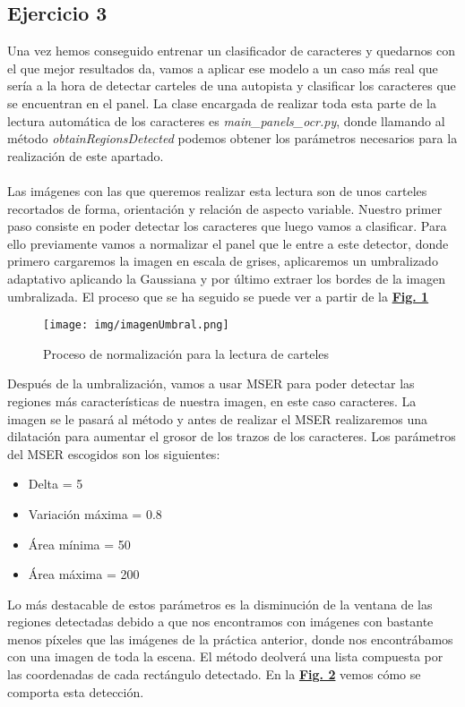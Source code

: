 \documentclass[a4paper, 12pt]{article}
\begin{document}
\subsection{Ejercicio 3}
Una vez hemos conseguido entrenar un clasificador de caracteres y quedarnos con el que mejor resultados da, vamos a aplicar ese modelo a un caso más real que sería a la hora de detectar carteles de una autopista y clasificar los caracteres que se encuentran en el panel. La clase encargada de realizar toda esta parte de la lectura automática de los caracteres es \textit{main\_panels\_ocr.py}, donde llamando al método \textit{obtainRegionsDetected} podemos obtener los parámetros necesarios para la realización de este apartado. \\\\
Las imágenes con las que queremos realizar esta lectura son de unos carteles recortados de forma, orientación y relación de aspecto variable. Nuestro primer paso consiste en poder detectar los caracteres que luego vamos a clasificar. Para ello previamente vamos a normalizar el panel que le entre a este detector, donde primero cargaremos la imagen en escala de grises, aplicaremos un umbralizado adaptativo aplicando la Gaussiana y por último extraer los bordes de la imagen umbralizada. El proceso que se ha seguido se puede ver a partir de la \textbf{\hyperref[fig:normalizacion]{Fig. 1}}
\newpage
\begin{figure}[h]
	\centering
	\texttt{[image: img/imagenUmbral.png]}
 	\caption{Proceso de normalización para la lectura de carteles}\vspace{0.5cm}
	\label{fig:normalizacion}
\end{figure}
Después de la umbralización, vamos a usar MSER para poder detectar las regiones más características de nuestra imagen, en este caso caracteres. La imagen se le pasará al método y antes de realizar el MSER realizaremos una dilatación para aumentar el grosor de los trazos de los caracteres. Los parámetros del MSER escogidos son los siguientes:
\begin{itemize}
    \item Delta = 5
    \item Variación máxima = 0.8
    \item Área mínima = 50
    \item Área máxima = 200
\end{itemize}
Lo más destacable de estos parámetros es la disminución de la ventana de las regiones detectadas debido a que nos encontramos con imágenes con bastante menos píxeles que las imágenes de la práctica anterior, donde nos encontrábamos con una imagen de toda la escena. El método deolverá una lista compuesta por las coordenadas de cada rectángulo detectado. En la \textbf{\hyperref[fig:normalizacion]{Fig. 2}} vemos cómo se comporta esta detección. 
\end{document}
